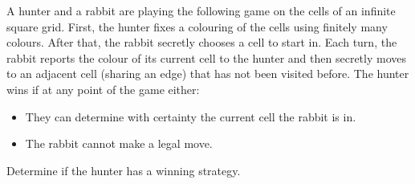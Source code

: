 A hunter and a rabbit are playing the following game on the cells of an infinite square grid.
First, the hunter fixes a colouring of the cells using finitely many colours.
After that, the rabbit secretly chooses a cell to start in.
Each turn, the rabbit reports the colour of its current cell to the hunter and then
secretly moves to an adjacent cell (sharing an edge) that has not been visited before.
The hunter wins if at any point of the game either:
\begin{itemize}
    \item They can determine with certainty the current cell the rabbit is in.
    \item The rabbit cannot make a legal move.
\end{itemize}
Determine if the hunter has a winning strategy.
